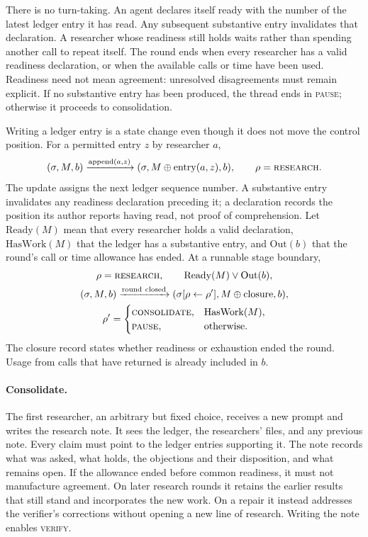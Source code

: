\documentclass[11pt,a4paper]{article}
\newcommand{\st}[1]{\textsc{#1}}
\begin{document}
There is no turn-taking. An agent declares itself ready with the number of the
latest ledger entry it has read. Any subsequent substantive entry invalidates
that declaration. A researcher whose readiness still holds waits rather than
spending another call to repeat itself. The round ends when every researcher has
a valid readiness declaration, or when the available calls or time have been
used. Readiness need not mean agreement: unresolved disagreements must remain
explicit. If no substantive entry has been produced, the thread ends in
\st{pause}; otherwise it proceeds to consolidation.

Writing a ledger entry is a state change even though it does not move the
control position. For a permitted entry \(z\) by researcher \(a\),
\[
 (\sigma,M,b)\xrightarrow{\mathrm{append}(a,z)}
 (\sigma,M\oplus\mathrm{entry}(a,z),b),\qquad\rho=\st{research}.
\]
The update assigns the next ledger sequence number. A substantive entry
invalidates any readiness declaration preceding it; a declaration records the
position its author reports having read, not proof of comprehension. Let
\(\mathrm{Ready}(M)\) mean that every researcher holds a valid declaration,
\(\mathrm{HasWork}(M)\) that the ledger has a substantive entry, and
\(\mathrm{Out}(b)\) that the round's call or time allowance has ended. At a
runnable stage boundary,
\[
 \begin{gathered}
 \rho=\st{research},\qquad \mathrm{Ready}(M)\lor\mathrm{Out}(b),\\
 (\sigma,M,b)\xrightarrow{\mathrm{round\ closed}}
 (\sigma[\rho\leftarrow\rho'],M\oplus\mathrm{closure},b),\\
 \rho'=\begin{cases}
  \st{consolidate},&\mathrm{HasWork}(M),\\
  \st{pause},&\text{otherwise}.
 \end{cases}
 \end{gathered}
\]
The closure record states whether readiness or exhaustion ended the round. Usage
from calls that have returned is already included in \(b\).

\paragraph{Consolidate.}
The first researcher, an arbitrary but fixed choice, receives a new prompt and
writes the research note. It sees the ledger, the researchers' files, and any
previous note. Every claim must point to the ledger entries supporting it. The
note records what was asked, what holds, the objections and their disposition,
and what remains open. If the allowance ended before common readiness, it must
not manufacture agreement. On later research rounds it retains the earlier
results that still stand and incorporates the new work. On a repair it instead
addresses the verifier's corrections without opening a new line of research.
Writing the note enables \st{verify}.
\end{document}
